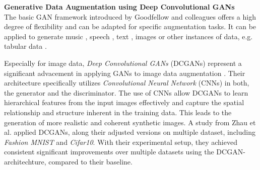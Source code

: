 

\noindent\textbf{Generative Data Augmentation using Deep Convolutional GANs}\label{dcgans_data_augmentation} \\
The basic GAN framework introduced by Goodfellow and colleagues offers a high degree of flexibility and can be adapted for specific augmentation tasks. It can be applied to generate music \cite{dong2017museganmultitracksequentialgenerative}, speech \cite{li2022ttsgantransformerbasedtimeseriesgenerative}, text \cite{yu2017seqgansequencegenerativeadversarial}, images \cite{goodfellow2014generativeadversarialnetworks} or other instances of data, e.g. tabular data \cite{xu2019modelingtabulardatausing}.

Especially for image data, \textit{Deep Convolutional GANs} (DCGANs) \cite{Radford2015DCGAN} represent a significant advacement in applying GANs to image data augmentation \cite{huang2022tutorial}. Their architecture specifically utilizes \textit{Convolutional Neural Network} (CNNs) \cite{LeCun1989firstcnnpaper} in both, the generator and the discriminator. The use of CNNs allow DCGANs to learn hierarchical features from the input images effectively and capture the spatial relationship and structure inherent in the training data. This leads to the generation of more realistic and coherent synthetic images. A study from Zhau et al. \cite{zhao2023gan} applied DCGANs, along their adjusted versions on multiple dataset, including \textit{Fashion MNIST} and \textit{Cifar10}. With their experimental setup, they achieved consistent significant improvements over multiple datasets using the DCGAN-architechture, compared to their baseline. \\



